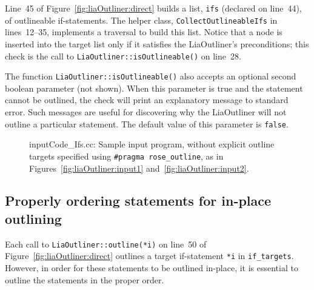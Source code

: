 Line~45 of Figure~\ref{fig:liaOutliner:direct} builds a list,
\texttt{ifs} (declared on line~44), of outlineable if-statements.  The
helper class, \texttt{CollectOutlineableIfs} in lines~12--35,
implements a traversal to build this list. Notice that a node is
inserted into the target list only if it satisfies the LiaOutliner's
preconditions; this check is the call to
\texttt{LiaOutliner::isOutlineable()} on line~28.

The function \texttt{LiaOutliner::isOutlineable()} also accepts an
optional second boolean parameter (not shown). When this parameter is
true and the statement cannot be outlined, the check will print an
explanatory message to standard error. Such messages are useful for
discovering why the LiaOutliner will not outline a particular
statement. The default value of this parameter is \texttt{false}.

\begin{figure}[!h]
{\indent
{\mySmallFontSize
\begin{latexonly}
   
\end{latexonly}
\begin{htmlonly}
   
\end{htmlonly}

}
}
\caption{inputCode\_Ifs.cc: Sample input program, without explicit
outline targets specified using \texttt{\#pragma rose\_outline}, as in
Figures~\ref{fig:liaOutliner:input1}
and~\ref{fig:liaOutliner:input2}.}
\label{fig:liaOutliner:input3}
\end{figure}

\subsection{Properly ordering statements for in-place outlining}
\label{sec:liaOutliner:direct:ordering}

Each call to \texttt{LiaOutliner::outline(*i)} on line~50 of
Figure~\ref{fig:liaOutliner:direct} outlines a target if-statement
\texttt{*i} in \texttt{if\_targets}. However, in order for these
statements to be outlined in-place, it is essential to outline the
statements in the proper order.

